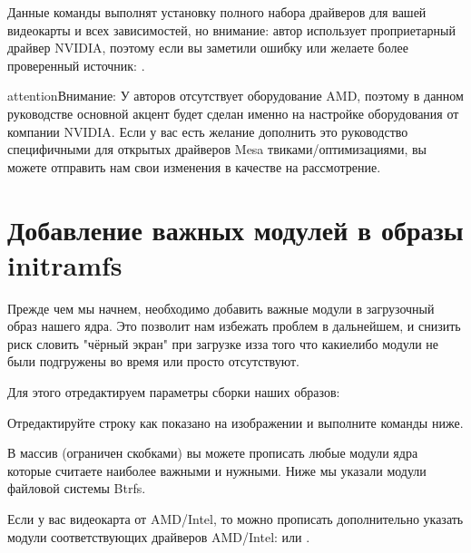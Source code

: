 \documentclass[letterpaper,10pt,russian,openany]{sphinxmanual}
\begin{document}
\sphinxAtStartPar
Данные команды выполнят установку полного набора драйверов для вашей видеокарты и всех зависимостей,
но внимание: автор использует проприетарный драйвер NVIDIA, поэтому если вы заметили ошибку или желаете более проверенный источник: .

\begin{sphinxadmonition}{attention}{Внимание:}
\sphinxAtStartPar
У авторов отсутствует оборудование AMD, поэтому в данном руководстве основной акцент будет сделан именно на настройке оборудования от компании NVIDIA.
Если у вас есть желание дополнить это руководство специфичными для открытых драйверов Mesa твиками/оптимизациями,
вы можете отправить нам свои изменения в качестве  на рассмотрение.
\end{sphinxadmonition}

\ignorespaces 

\section{Добавление важных модулей в образы initramfs}
\label{\detokenize{source/first-steps:initramfs}}\label{\detokenize{source/first-steps:important-modules}}\label{\detokenize{source/first-steps:index-9}}
\sphinxAtStartPar
Прежде чем мы начнем, необходимо добавить важные модули в загрузочный образ
нашего ядра.
Это позволит нам избежать проблем в дальнейшем, и снизить риск словить
"чёрный экран" при загрузке из\sphinxhyphen{}за того что какие\sphinxhyphen{}либо модули не были подгружены во время или просто отсутствуют.

\sphinxAtStartPar
Для этого отредактируем параметры сборки наших образов: 

\sphinxAtStartPar
Отредактируйте строку  как показано на изображении и выполните команды ниже.

\sphinxAtStartPar
В массив (ограничен скобками) вы можете прописать любые модули ядра которые считаете наиболее важными и нужными.
Ниже мы указали модули файловой системы Btrfs.

\sphinxAtStartPar
Если у вас видеокарта от AMD/Intel, то можно прописать дополнительно указать модули соответствующих драйверов AMD/Intel:
 или .
\end{document}
